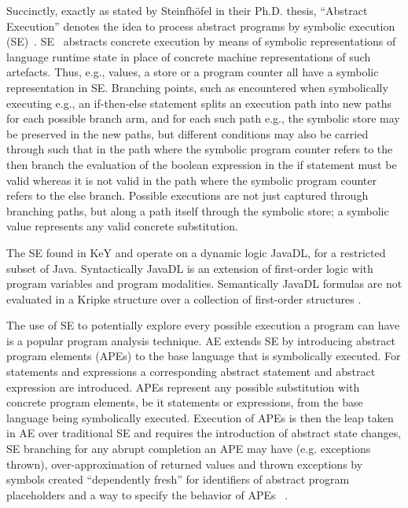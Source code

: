 Succinctly, exactly as stated by Steinfhöfel in their Ph.D. thesis, ``Abstract Execution'' denotes the idea to process abstract programs by symbolic execution (SE)~\cite{steinhoefel-20}.
SE~\cite{DBLP:journals/csur/BaldoniCDDF18,DBLP:journals/ac/YangFBCW19} abstracts concrete execution by means of symbolic representations of language runtime
state in place of concrete machine representations of such artefacts.
Thus, e.g., values, a store or a program counter all have a symbolic representation in SE.
Branching points, such as encountered when symbolically executing e.g., an if-then-else statement splits an execution path into new paths for each possible branch arm, and for each such
path e.g., the symbolic store may be preserved in the new paths, but different conditions may also be carried through such that in the path where the symbolic program counter refers
to the then branch the evaluation of the boolean expression in the if statement must be valid whereas it is not valid in the path where the symbolic program counter refers to the else branch.
Possible executions are not just captured through branching paths, but along a path itself through the symbolic store; a symbolic value represents any valid concrete substitution.

The SE found in KeY and \Refinity{} operate on a dynamic logic JavaDL, for a restricted subset of Java.
Syntactically JavaDL is an extension of first-order logic with program variables and program modalities.
Semantically JavaDL formulas are not evaluated in a Kripke structure
over a collection of first-order structures \cite{DBLP:series/lncs/10001}.

The use of SE to potentially explore every possible execution a program can have is a popular program analysis technique. AE extends SE by
introducing abstract program elements (APEs) to the base language that is symbolically executed.
For statements and expressions a corresponding abstract statement and abstract expression are introduced.
APEs represent any possible substitution with concrete program elements, be it statements or expressions, from the base language being symbolically executed.
Execution of APEs is then the leap taken in AE over traditional SE and requires the introduction of abstract state changes, SE branching for
any abrupt completion an APE may have (e.g. exceptions thrown),
over-approximation of returned values and thrown exceptions by symbols created ``dependently fresh'' for identifiers of abstract program placeholders and a way to specify the behavior of APEs ~\cite{steinhoefel-20}.

